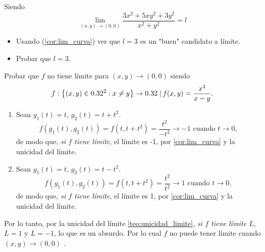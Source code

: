\begin{tarea}Siendo  $$\lim_{(x,y)\rightarrow (0,0)} \dfrac{ 3x^{2} + 5xy^{2}+3y^{2}}{x^{2} + y^{2}} = l$$
\begin{itemize}
\item[1.] Usando  (\ref{cor:lim_curva})  ver que $l=3$  es un "buen" candidato a l\'imite. 
\item[2.] Probar que $l=3.$
\end{itemize}
\end{tarea}



\begin{example} Probar que $f$ no tiene l\'imite para $(x,y) \to (0,0)$ siendo $$ f: \left\lbrace (x,y) \in 0.32^2 : x \ne y \right\rbrace \to 0.32 \: |\:  f(x,y) = \frac{x^2}{x - y}.$$
   \begin{enumerate} 
   \item  Sean $g_1(t) = t, \,  g_2(t) = t + t^2$.
  \[
   f(g_1(t),g_2(t)) = f(t,t + t^2) = \frac{t^2}{-t^2} \to -1 \text{ cuando } t \to 0,
  \]
  de modo que, \emph{si $f$ tiene l\'imite}, el l\'imite es -1, por \eqref{cor:lim_curva} y la unicidad del l\'imite.
  \item  Sean $g_1(t) = t, \, g_2(t) = t - t^2$.
  \[
   f(g_1(t),g_2(t)) = f(t,t + t^2) = \frac{t^2}{t^2} \to 1 \text{ cuando } t \to 0,
  \]
  de modo que, \emph{si $f$ tiene l\'imite}, el l\'imite es 1, por \eqref{cor:lim_curva} y la unicidad del l\'imite.
  \end{enumerate}
  Por lo tanto, por la unicidad del l\'imite \eqref{teo:unicidad_limite}, \emph{si $f$ tiene l\'imite $L$}, $L = 1$ y $ L= -1$, lo que es un absurdo.  Por lo cual $f$ no puede tener l\'imite cuando  $(x,y) \to (0,0)$  .
\end{example}



